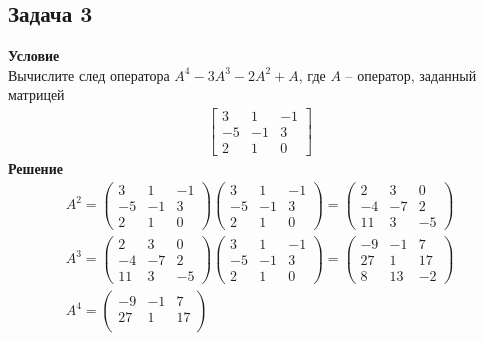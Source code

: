 		\subsection*{\textbf{Задача 3}}
		\textbf{Условие}\\
		Вычислите след оператора $A^4 - 3A^3 - 2A^2 + A$, где $A$ -- оператор, заданный матрицей
		\begin{gather*}
			\left[\begin{array}{ccc}
				3 & 1 & -1 \\
				-5 & -1 & 3 \\
				2 & 1 & 0
			\end{array}\right]
		\end{gather*}
		\textbf{Решение}\\
		\begin{gather*}
			A^2 = 
			\begin{pmatrix}
				3 & 1 & -1\\
				-5 & -1 & 3\\
				2 & 1 & 0
			\end{pmatrix}
			\begin{pmatrix}
				3 & 1 & -1\\
				-5 & -1 & 3\\
				2 & 1 & 0
			\end{pmatrix}
			=
			\begin{pmatrix}
				2 & 3 & 0\\
				-4 & -7 & 2\\
				11 & 3 & -5
			\end{pmatrix}\\
			A^3 =
			\begin{pmatrix}
				2 & 3 & 0\\
				-4 & -7 & 2\\
				11 & 3 & -5
			\end{pmatrix}
			\begin{pmatrix}
				3 & 1 & -1\\
				-5 & -1 & 3\\
				2 & 1 & 0
			\end{pmatrix}
			= 
			\begin{pmatrix}
				-9 & -1 & 7\\
				27 & 1 & 17\\
				8 & 13 & -2
			\end{pmatrix}\\
			A^4 = 
			\begin{pmatrix}
				-9 & -1 & 7\\
				27 & 1 & 17\\

\end{pmatrix}
\end{gather*}
